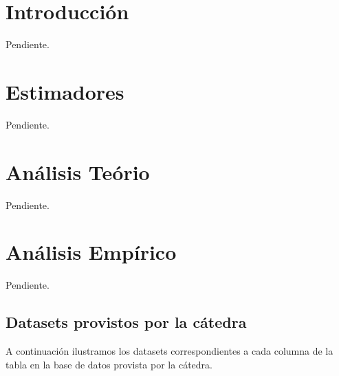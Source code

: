 \documentclass[a4paper, 10pt, twoside]{article}
\begin{document}
\newpage




\section{Introducción}

Pendiente.




\section{Estimadores}

Pendiente.




\section{Análisis Teório}

Pendiente.




\section{Análisis Empírico}

Pendiente.


\subsection{Datasets provistos por la cátedra}

A continuación ilustramos los datasets correspondientes a cada columna de la tabla en la base de datos provista por la cátedra.
\end{document}

